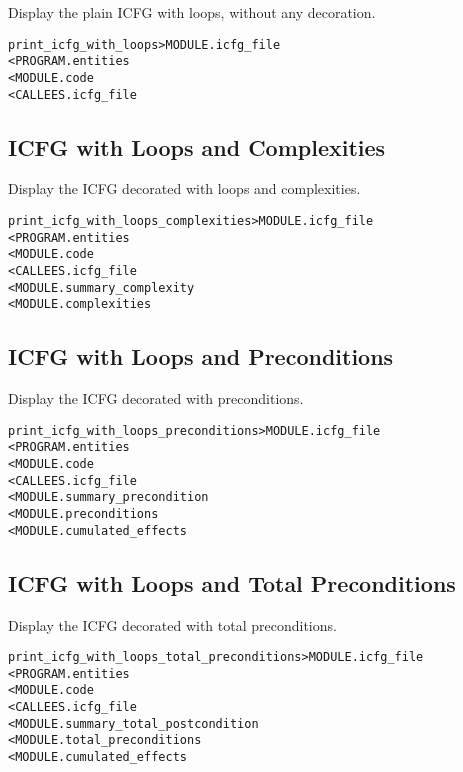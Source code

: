 \documentclass[a4paper]{report}
\newenvironment{PipsMake}{\begin{alltt}}{\end{alltt}}
\begin{document}
Display the plain ICFG with loops, without any decoration.
\begin{PipsMake}
print_icfg_with_loops                    > MODULE.icfg_file
        < PROGRAM.entities
        < MODULE.code
        < CALLEES.icfg_file
\end{PipsMake}

\subsection{ICFG with Loops and Complexities}

Display the ICFG decorated with loops and complexities.
\begin{PipsMake}
print_icfg_with_loops_complexities       > MODULE.icfg_file
        < PROGRAM.entities
        < MODULE.code
        < CALLEES.icfg_file
        < MODULE.summary_complexity
        < MODULE.complexities
\end{PipsMake}

\subsection{ICFG with Loops and Preconditions}

Display the ICFG decorated with preconditions.
\begin{PipsMake}
print_icfg_with_loops_preconditions      > MODULE.icfg_file
        < PROGRAM.entities
        < MODULE.code
        < CALLEES.icfg_file
        < MODULE.summary_precondition
        < MODULE.preconditions
        < MODULE.cumulated_effects
\end{PipsMake}

\subsection{ICFG with Loops and Total Preconditions}

Display the ICFG decorated with total preconditions.
\begin{PipsMake}
print_icfg_with_loops_total_preconditions      > MODULE.icfg_file
        < PROGRAM.entities
        < MODULE.code
        < CALLEES.icfg_file
        < MODULE.summary_total_postcondition
        < MODULE.total_preconditions
        < MODULE.cumulated_effects
\end{PipsMake}
\end{document}
